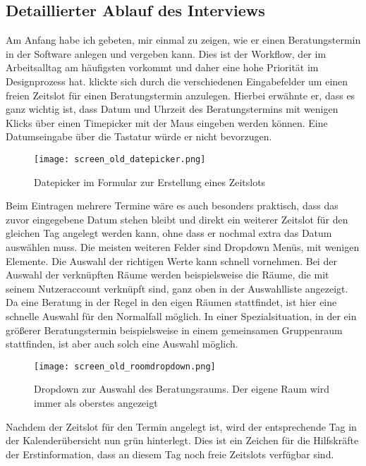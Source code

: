 \subsection*{Detaillierter Ablauf des Interviews}
Am Anfang habe ich \ipName gebeten, mir einmal zu zeigen, wie er einen
Beratungstermin in der Software anlegen und vergeben kann. Dies ist der
Workflow, der im Arbeitsalltag am häufigsten vorkommt und daher eine hohe
Priorität im Designprozess hat. \ipName klickte sich durch die verschiedenen
Eingabefelder um einen freien Zeitslot für einen Beratungstermin anzulegen.
Hierbei erwähnte er, dass es ganz wichtig ist, dass Datum und Uhrzeit des
Beratungstermins mit wenigen Klicks über einen \gls{Timepicker} mit der Maus
eingeben werden können. Eine Datumseingabe über die Tastatur würde er nicht
bevorzugen.

\begin{figure}[H]
    \caption{Datepicker im Formular zur Erstellung eines Zeitslots}
    \centering
    \texttt{[image: screen\_old\_datepicker.png]}
\end{figure}

Beim Eintragen mehrere Termine wäre es auch besonders praktisch, dass das zuvor
eingegebene Datum stehen bleibt und direkt ein weiterer Zeitslot für den
gleichen Tag angelegt werden kann, ohne dass er nochmal extra das Datum
auswählen muss. Die meisten weiteren Felder sind Dropdown Menüs, mit wenigen
Elemente. Die Auswahl der richtigen Werte kann \ipName schnell vornehmen. Bei
der Auswahl der verknüpften Räume werden beispielsweise die Räume, die mit
seinem Nutzeraccount verknüpft sind, ganz oben in der Auswahlliste angezeigt.
Da eine Beratung in der Regel in den eigen Räumen stattfindet, ist hier eine
schnelle Auswahl für den Normalfall möglich. In einer Spezialsituation, in der
ein größerer Beratungstermin beispielsweise in einem gemeinsamen Gruppenraum
stattfinden, ist aber auch solch eine Auswahl möglich.

\begin{figure}[H]
    \caption{Dropdown zur Auswahl des Beratungsraums. Der eigene Raum wird immer als oberstes angezeigt}
    \centering
    \texttt{[image: screen\_old\_roomdropdown.png]}
\end{figure}

Nachdem der Zeitslot für den Termin angelegt ist, wird der entsprechende Tag in
der Kalenderübersicht nun grün hinterlegt. Dies ist ein Zeichen für die
Hilfskräfte der Erstinformation, dass an diesem Tag noch freie Zeitslots
verfügbar sind.

